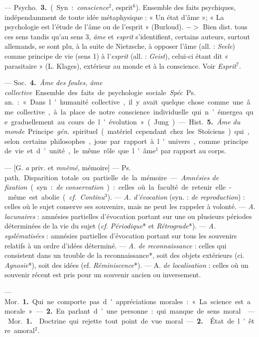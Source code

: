 \begin{itemize}[leftmargin=1cm, label=, itemsep=1pt]
{{{— \si{Psycho.} {\bf 3.} (Syn. : {\it conscience}$^2$,
esprit$^6$). Ensemble des faits psychiques, indépendamment de toute
idée métaphysique : « Un état
d'âme »; « La psychologie est l'étude
de l'âme ou de l'esprit » (Burloud).
$->$ Bien dist. tous ces sens
tandis qu'au sens 3, {\it âme} et {\it esprit}
s'identifient, certains auteurs, surtout allemands, se sont plu, à la suite
de Nietzsche, à opposer l’âme (all. :
{\it Seele}) comme principe de vie (sens 1)
à l'{\it esprit} (all. : {\it Geist}), celui-ci étant
dit « parasitaire » (L. Klages),
extérieur au monde et à la conscience. Voir {\it Esprit}$^7$.

— \si{Soc.} {\bf 4.} {\it Âme des foules, âme
collective}. Ensemble des faits de
psychologie sociale. {\it Spéc}. \si{Ps. an.} :
« Dans l'humanité collective, il y
avait quelque chose comme une âme
collective, à la place de notre conscience individuelle qui n’émergea
que graduellement au cours de
l'évolution » (Jung).

— \si{Hist.} {\bf 5.} {\it Âme du monde}. Principe  {\it gén.} spirituel (matériel
cependant chez les Stoïciens) qui, selon
certains philosophes, joue par rapport à l'univers, comme principe
de vie et d'unité, le même rôle que
l'âme$^1$ par rapport au corps.

 — [G. {\it a} priv. et {\it mnêmé}, mémoire] — \si{Ps. path.} Disparition
totale ou partielle de la mémoire.
— {\it Amnésies de fixation} (syn. : {\it de
conservation}) : celles où la faculté de
retenir elle-même est abolie ({\it cf.}  {\it Continu}$^3$).
— {\it A. d'évocation} (syn. : {\it de
reproduction}) : celles où le sujet conserve ses souvenirs, mais ne peut les
rappeler à volonté. — {\it A. lacunaires} :
amnésies partielles d’évocation portant sur une ou plusieurs périodes
déterminées de la vie du sujet ({\it cf.} 
{\it Périodique}* et {\it Rétrograde}*). — {\it A.
syslématisées} : amnésies partielles
d'évocation portant sur tous les souvenirs relatifs à un ordre d'idées
déterminé. — {\it A. de reconnaissance} :
celles qui consistent dans un trouble
de la reconnaissance*, soit des objets
extérieurs (ci. {\it Agnosie}*), soit des
idées (ef. {\it Réminiscence}*). — A. {\it de
localisation} : celles où un souvenir
récent est pris pour un souvenir
ancien ou inversement.

 — \si{Mor.} {\bf 1.} Qui ne comporte
pas d'appréciations morales : « La
science est amorale ». — {\bf 2.} En parlant d’une personne : qui manque
de sens moral.

 — \si{Mor.} {\bf 1.}  Doctrine qui
rejette tout point de vue moral. —
 {\bf 2.}  État de l'être amoral$^2$.

}}}
\end{itemize}
